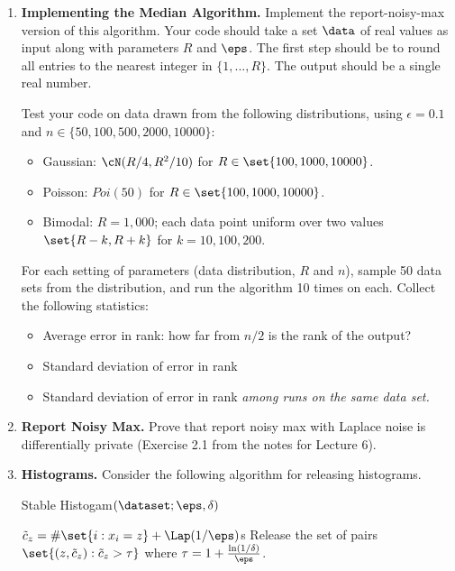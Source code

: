 \documentclass[11pt]{article}
\begin{document}
\begin{enumerate}[leftmargin=\parindent, itemsep=3ex]
\begin{enumerate}
        \end{enumerate}

          \item \textbf{Implementing the Median Algorithm.} Implement the report-noisy-max version of this
            algorithm. Your code should take a set $\data$ of real
            values as input along with parameters $R$ and $\eps$. The
            first step should be to round all entries to the nearest
            integer in $\{1,...,R\}$. The output should be a single
            real number.

           Test your code on data drawn from the following
           distributions, using $\epsilon = 0.1$ and $n \in \{50,100,500, 2000, 10000\}$:
           \begin{itemize}
           \item Gaussian: $\cN(R/4, R^2/10)$ for $R \in
             \set{100,1000,10000}$.
           \item Poisson: $\textit{Poi}(50)$ for $R \in 
             \set{100,1000,10000}$.
           \item Bimodal: $R=1,000$; each data point uniform over two
             values $\set{R-k, R+k}$ for $k = 10, 100, 200$.
             \end{itemize}
             For each setting of parameters (data distribution, $R$
             and $n$), sample 50 data sets from the distribution, and
             run the algorithm 10 times on each. Collect the following
             statistics:
             \begin{itemize}
             \item Average error in rank: how far from $n/2$ is the
               rank of the output?
             \item Standard deviation of error in rank
             \item Standard deviation of error in rank \emph{among runs on
               the same data set.}
           \end{itemize}

         
        
\item \textbf{Report Noisy Max.} Prove that report noisy max with Laplace noise is differentially
  private (Exercise 2.1 from the notes for Lecture 6).

\item         \textbf{Histograms.}
  Consider the following algorithm for releasing histograms.
  
  \begin{algorithm}[H]
  	\DontPrintSemicolon
    \caption{Stable Histogam$(\dataset; \eps,\delta)$}
    {
      $\tilde c_z = \#\set{i: x_i =z} + \Lap(1/\eps)$s
    }
    Release the set of pairs $\set{(z, \tilde c_z) : \tilde c_z >
      \tau}$ where $\tau = 1+ \frac{\ln(1/\delta)}{\eps}$. 
  \end{algorithm}


\end{enumerate}
\end{document}
